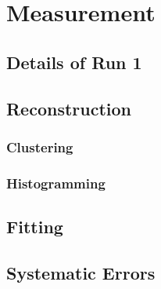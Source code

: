 
\chapter{\wa Measurement}
\label{chapter:SpinPrecessionMeasurement}
\thispagestyle{myheadings}

\section{Details of Run 1}
\label{sec:Data}

\section{Reconstruction}
\label{sec:ReconWest}

\subsection{Clustering}
\label{sec:Clustering}

\subsection{Histogramming}
\label{sec:Histogramming}

\section{Fitting}
\label{sec:Fitting}

\section{Systematic Errors}
\label{sec:Systematic Errors}
